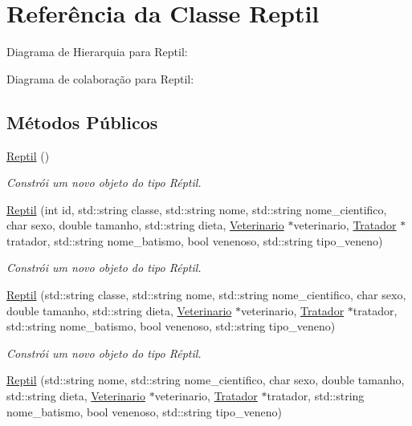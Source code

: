 \hypertarget{classReptil}{}\section{Referência da Classe Reptil}
\label{classReptil}


Diagrama de Hierarquia para Reptil\+:


Diagrama de colaboração para Reptil\+:
\subsection*{Métodos Públicos}
\begin{DoxyCompactItemize}
\item 
\mbox{\label{classReptil_a8d4e391e335678b7ed64eda95e050553}} 
\hyperlink{classReptil_a8d4e391e335678b7ed64eda95e050553}{Reptil} ()
\begin{DoxyCompactList}\small\item\em Constrói um novo objeto do tipo Réptil. \end{DoxyCompactList}\item 
\hyperlink{classReptil_a5bd50bf15e8ee41022daf6b12d9c880e}{Reptil} (int id, std\+::string classe, std\+::string nome, std\+::string nome\+\_\+cientifico, char sexo, double tamanho, std\+::string dieta, \hyperlink{classVeterinario}{Veterinario} $\ast$veterinario, \hyperlink{classTratador}{Tratador} $\ast$tratador, std\+::string nome\+\_\+batismo, bool venenoso, std\+::string tipo\+\_\+veneno)
\begin{DoxyCompactList}\small\item\em Constrói um novo objeto do tipo Réptil. \end{DoxyCompactList}\item 
\hyperlink{classReptil_a5cf1117f6898fcc0a9e0ce9aed4a446c}{Reptil} (std\+::string classe, std\+::string nome, std\+::string nome\+\_\+cientifico, char sexo, double tamanho, std\+::string dieta, \hyperlink{classVeterinario}{Veterinario} $\ast$veterinario, \hyperlink{classTratador}{Tratador} $\ast$tratador, std\+::string nome\+\_\+batismo, bool venenoso, std\+::string tipo\+\_\+veneno)
\begin{DoxyCompactList}\small\item\em Constrói um novo objeto do tipo Réptil. \end{DoxyCompactList}\item 
\hyperlink{classReptil_a30f237a6e3666277eacd04d9d030e93d}{Reptil} (std\+::string nome, std\+::string nome\+\_\+cientifico, char sexo, double tamanho, std\+::string dieta, \hyperlink{classVeterinario}{Veterinario} $\ast$veterinario, \hyperlink{classTratador}{Tratador} $\ast$tratador, std\+::string nome\+\_\+batismo, bool venenoso, std\+::string tipo\+\_\+veneno)

\end{DoxyCompactItemize}
